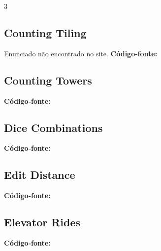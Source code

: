 \documentclass[8pt]{extarticle}
\begin{document}
\begin{multicols*}{3}
\subsection{Counting Tiling}
Enunciado não encontrado no site.
\vspace{0.3cm}
\noindent\textbf{Código-fonte:}


\subsection{Counting Towers}
\begin{caixaenunciado}

\end{caixaenunciado}
\vspace{0.3cm}
\noindent\textbf{Código-fonte:}


\subsection{Dice Combinations}
\begin{caixaenunciado}

\end{caixaenunciado}
\vspace{0.3cm}
\noindent\textbf{Código-fonte:}


\subsection{Edit Distance}
\begin{caixaenunciado}

\end{caixaenunciado}
\vspace{0.3cm}
\noindent\textbf{Código-fonte:}


\subsection{Elevator Rides}
\begin{caixaenunciado}

\end{caixaenunciado}
\vspace{0.3cm}
\noindent\textbf{Código-fonte:}



\end{multicols*}
\end{document}
